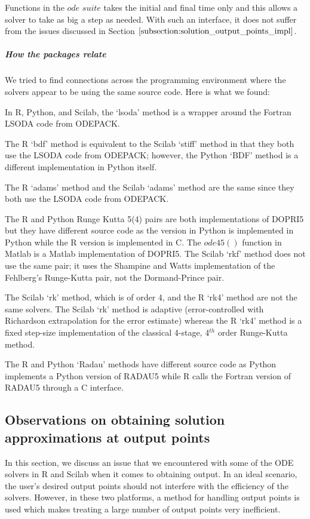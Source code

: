 Functions in the $ode$ $suite$ takes the initial and final time only and this allows a solver to take as big a step as needed. With such an interface, it does not suffer from the issues discussed in Section $\ref{subsection:solution_output_points_impl}$. 

\subparagraph{How the packages relate}
We tried to find connections across the programming environment where the solvers appear to be using the same source code.
Here is what we found:

In R, Python, and Scilab, the `lsoda' method is a wrapper around the Fortran LSODA code from ODEPACK.

The R `bdf' method is equivalent to the Scilab `stiff' method in that they both use the LSODA code from ODEPACK; however, the Python `BDF' method is a different implementation in Python itself.

The R `adams' method and the Scilab `adams' method are the same since they both use the LSODA code from ODEPACK.

The R and Python Runge Kutta 5(4) pairs are both implementations of DOPRI5 but they have different source code as the version in Python is implemented in Python while the R version is implemented in C. The $ode45()$ function in Matlab is a Matlab implementation of DOPRI5. The Scilab `rkf' method does not use the same pair; it uses the Shampine and Watts implementation of the Fehlberg's Runge-Kutta pair, not the Dormand-Prince pair. 

The Scilab `rk' method, which is of order 4, and the R `rk4' method are not the same solvers. The Scilab `rk' method is adaptive (error-controlled with Richardson extrapolation for the error estimate) whereas the R `rk4' method is a fixed step-size implementation of the classical 4-stage, 4$^{th}$ order Runge-Kutta method.

The R and Python `Radau' methods have different source code as Python implements a Python version of RADAU5 while R calls the Fortran version of RADAU5 through a C interface.

\subsection{Observations on obtaining solution approximations at output points}
\label{subsection:solution_output_points_impl}
In this section, we discuss an issue that we encountered with some of the ODE solvers in R and Scilab when it comes to obtaining output. In an ideal scenario, the user's desired output points should not interfere with the efficiency of the solvers. However, in these two platforms, a method for handling output points is used which makes treating a large number of output points very inefficient.

